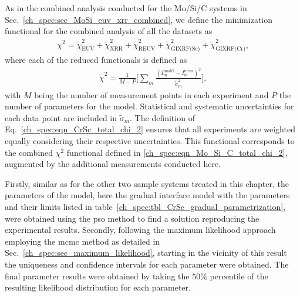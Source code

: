 As in the combined analysis conducted for the Mo/Si/C systems in Sec.~\ref{ch_spec:sec_MoSi_euv_xrr_combined}, we define the minimization functional for the combined analysis of all the datasets as
\begin{align}
\chi^2 = \tilde{\chi}^2_\text{EUV} +\tilde{\chi}^2_\text{XRR} 
+\tilde{\chi}^2_\text{REUV} + 
\tilde{\chi}^2_\text{GIXRF(Sc)}+\tilde{\chi}^2_\text{GIXRF(Cr)}\text{,} 
\label{ch_spec:eqn_CrSc_total_chi_2}
\end{align}
where each of the reduced functionals is defined as
\begin{align}
\tilde{\chi}^2 = \frac{1}{M - P} \bigg[\sum\limits_{m} \frac{(I_m^\text{model} 
- I_m^\text{meas})^2}{\tilde{\sigma}_m^2} \bigg] \text{,} 
\label{ch_spec:eqn_CrSc_reduced_chi_2}
\end{align}
with $M$ being the number of measurement points in each experiment and $P$ the 
number of parameters for the model. Statistical and systematic uncertainties 
for each data point are included in $\tilde{\sigma}_m$. The definition of 
Eq.~\eqref{ch_spec:eqn_CrSc_total_chi_2} ensures that all experiments are weighted equally 
considering their respective uncertainties. This functional corresponds to the combined $\chi^2$ functional defined in \eqref{ch_spec:eqn_Mo_Si_C_total_chi_2}, augmented by the additional measurements conducted here.

Firstly, similar as for the other two sample systems treated in this chapter, the parameters of the model, here the gradual interface model with the parameters and their limits listed in table~\ref{ch_spec:tbl_CrSc_gradual_parametrization}, were obtained using the \gls{pso} method to find a solution reproducing the experimental results. Secondly, following the maximum likelihood approach employing the \gls{mcmc} method as detailed in Sec.~\ref{ch_spec:sec_maximum_likelihood}, starting in the vicinity of this result the uniqueness and confidence intervals for each parameter were obtained. The final parameter results were obtained by taking the $50\%$ percentile of the resulting likelihood distribution for each parameter.

